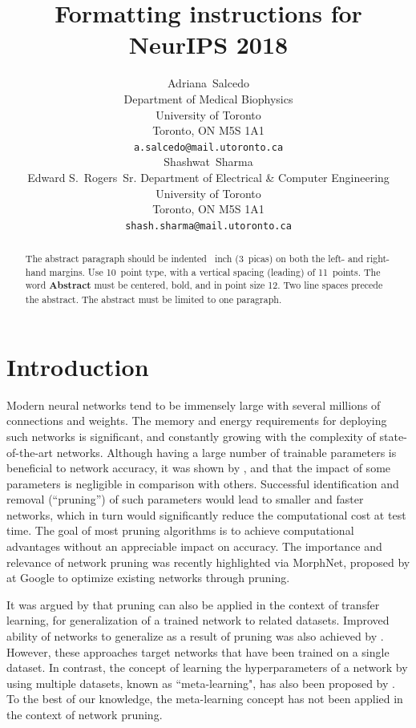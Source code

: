 \documentclass{article}
\title{Formatting instructions for NeurIPS 2018}
\author{%
  Adriana~Salcedo\\
  Department of Medical Biophysics\\
  University of Toronto\\
  Toronto, ON M5S 1A1\\
  \texttt{a.salcedo@mail.utoronto.ca} \\
   \And
   Shashwat~Sharma\\
   Edward S.~Rogers~Sr. Department of Electrical \& Computer Engineering \\
   University of Toronto\\
   Toronto, ON M5S 1A1\\
   \texttt{shash.sharma@mail.utoronto.ca} \\
}
\begin{document}

\maketitle

\begin{abstract}
  The abstract paragraph should be indented ~inch (3~picas) on
  both the left- and right-hand margins. Use 10~point type, with a vertical
  spacing (leading) of 11~points.  The word \textbf{Abstract} must be centered,
  bold, and in point size 12. Two line spaces precede the abstract. The abstract
  must be limited to one paragraph.
\end{abstract}

\section{Introduction}

Modern neural networks tend to be immensely large with several millions of connections and weights. The memory and energy requirements for deploying such networks is significant, and constantly growing with the complexity of state-of-the-art networks. Although having a large number of trainable parameters is beneficial to network accuracy, it was shown by \citet{NIPS_learning_weights_pruning}, \citet{OBD} and \citet{OBS} that the impact of some parameters is negligible in comparison with others. Successful identification and removal (``pruning'') of such parameters would lead to smaller and faster networks, which in turn would significantly reduce the computational cost at test time. The goal of most pruning algorithms is to achieve computational advantages without an appreciable impact on accuracy. The importance and relevance of network pruning was recently highlighted via MorphNet, proposed by \citet{morphnet} at Google to optimize existing networks through pruning.

It was argued by \citet{prune_transfer_learning} that pruning can also be applied in the context of transfer learning, for generalization of a trained network to related datasets. Improved ability of networks to generalize as a result of pruning was also achieved by \citet{prune_for_architecture}. However, these approaches target networks that have been trained on a single dataset. In contrast, the concept of learning the hyperparameters of a network by using multiple datasets, known as ``meta-learning", has also been proposed by \citet{metalearning1}. To the best of our knowledge, the meta-learning concept has not been applied in the context of network pruning.
\end{document}
